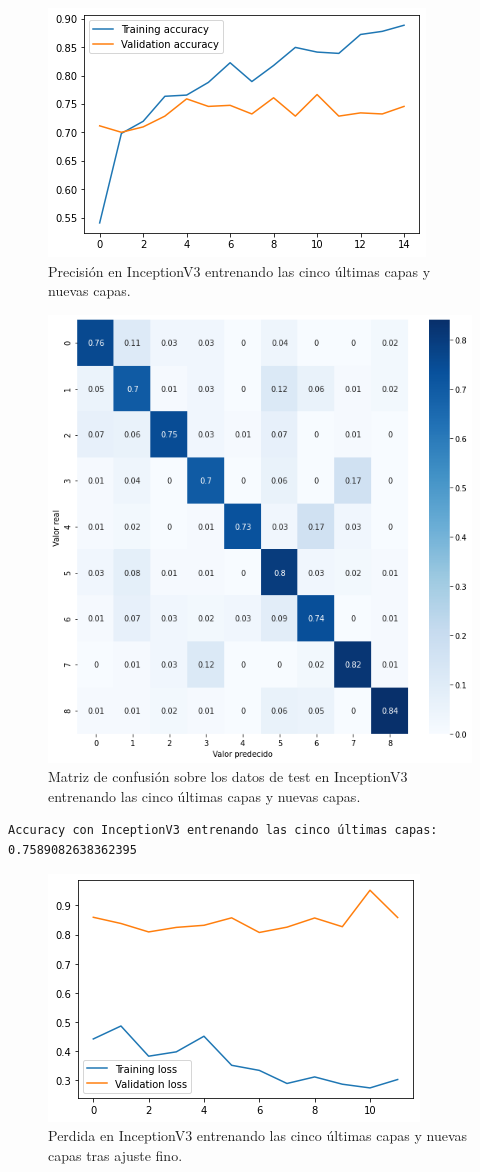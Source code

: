 \begin{figure}[H]
  \centering
  \includegraphics[width=0.5\linewidth]{Imagenes/entrenamiento_redes/5-ult/inception_5ult_acc.png}
  \caption{Precisión en InceptionV3 entrenando las cinco últimas capas y nuevas capas.}
\end{figure}

\begin{figure}[H]
  \centering
  \includegraphics[width=0.5\linewidth]{Imagenes/entrenamiento_redes/5-ult/inception_5ult_matriz.png}
  \caption{Matriz de confusión sobre los datos de test en InceptionV3 entrenando las cinco últimas capas y nuevas capas.}
\end{figure}


\begin{lstlisting}
Accuracy con InceptionV3 entrenando las cinco últimas capas: 0.7589082638362395
\end{lstlisting}


\begin{figure}[H]
  \centering
  \includegraphics[width=0.5\linewidth]{Imagenes/entrenamiento_redes/5-ult/inception_5fine_loss.png}
  \caption{Perdida en InceptionV3 entrenando las cinco últimas capas y nuevas capas tras ajuste fino.}
\end{figure}

